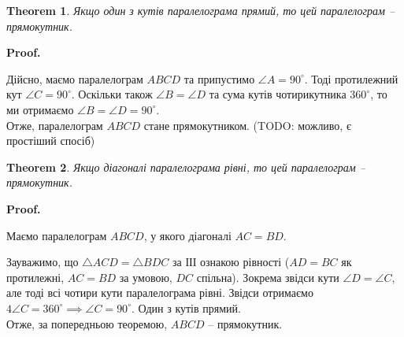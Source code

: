 \documentclass[a4paper, 10pt]{article}
\makeatletter
\def\qed{$\blacksquare$}
\theoremstyle{theoremdd}
\newtheorem{theorem}{Theorem}[subsection]
\theoremstyle{theoremdd}
\theoremstyle{theoremdd}
\theoremstyle{theoremdd}
\theoremstyle{theoremdd}
\theoremstyle{theoremdd}
\theoremstyle{theoremdd}
\theoremstyle{theoremdd}
\theoremstyle{theoremdd}
\renewenvironment{proof}[1][Proof.\\]{\par
\pushQED{\hfill \qed}%
\normalfont \topsep6\p@\@plus6\p@\relax
\trivlist
\item\relax
{\bfseries
#1\@addpunct{.}}\hspace\labelsep\ignorespaces
}{%
\popQED\endtrivlist\@endpefalse
}
\makeatother
\begin{document}
\begin{theorem}
Якщо один з кутів паралелограма прямий, то цей паралелограм -- прямокутник.
\end{theorem}

\begin{proof}
Дійсно, маємо паралелограм $ABCD$ та припустимо $\angle A = 90^\circ$. Тоді протилежний кут $\angle C = 90^\circ$. Оскільки також $\angle B = \angle D$ та сума кутів чотирикутника $360^\circ$, то ми отримаємо $\angle B = \angle D = 90^\circ$.\\
Отже, паралелограм $ABCD$ стане прямокутником. (TODO: можливо, є простіший спосіб)
\end{proof}

\begin{theorem}
Якщо діагоналі паралелограма рівні, то цей паралелограм -- прямокутник.
\end{theorem}

\begin{proof}
Маємо паралелограм $ABCD$, у якого діагоналі $AC = BD$.
\begin{figure}[H]
\centering
{}
\end{figure}
Зауважимо, що $\triangle ACD = \triangle BDC$ за ІІІ ознакою рівності ($AD = BC$ як протилежні, $AC = BD$ за умовою, $DC$ спільна). Зокрема звідси кути $\angle D = \angle C$, але тоді всі чотири кути паралелограма рівні. Звідси отримаємо $4 \angle C = 360^\circ \implies \angle C = 90^\circ$. Один з кутів прямий. \\
Отже, за попередньою теоремою, $ABCD$ -- прямокутник.
\end{proof}
\end{document}
